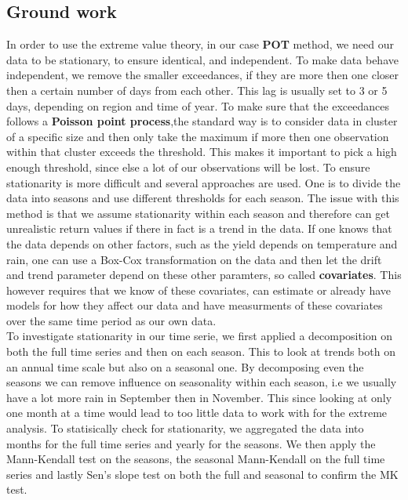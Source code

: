 \documentclass{article}
\begin{document}
	\subsection{Ground work}
	In order to use the extreme value theory, in our case \textbf{POT} method, we need our data to be stationary, to ensure identical, and independent. To make data behave independent, we remove the smaller exceedances, if they are more then one closer then a certain number of days from each other. This lag is usually set to 3 or 5 days, depending on region and time of year. To make sure that the exceedances follows a \textbf{Poisson point process},the standard way is to consider data in cluster of a specific size and then only take the maximum if more then one observation within that cluster exceeds the threshold. This makes it important to pick a high enough threshold, since else a lot of our observations will be lost.
	To ensure stationarity is more difficult and several approaches are used. One is to divide the data into seasons and use different thresholds for each season. The issue with this method is that we assume stationarity within each season and therefore can get unrealistic return values if there in fact is a trend in the data. If one knows that the data depends on other factors, such as the yield depends on temperature and rain, one can use a Box-Cox transformation on the data and then let the drift and trend parameter depend on these other paramters, so called \textbf{covariates}. This however requires that we know of these covariates, can estimate or already have models for how they affect our data and have measurments of these covariates over the same time period as our own data.\\
	To investigate stationarity in our time serie, we first applied a decomposition on both the full time series and then on each season. This to look at trends both on an annual time scale but also on a seasonal one. By decomposing even the seasons we can remove influence on seasonality within each season, i.e we usually have a lot more rain in September then in November. This since looking at only one month at a time would lead to too little data to work with for the extreme analysis. To statisically check for stationarity, we aggregated the data into months for the full time series and yearly for the seasons. We then apply the Mann-Kendall test on the seasons, the seasonal Mann-Kendall on the full time series and lastly Sen's slope test on both the full and seasonal to confirm the MK test.
	
\end{document}
